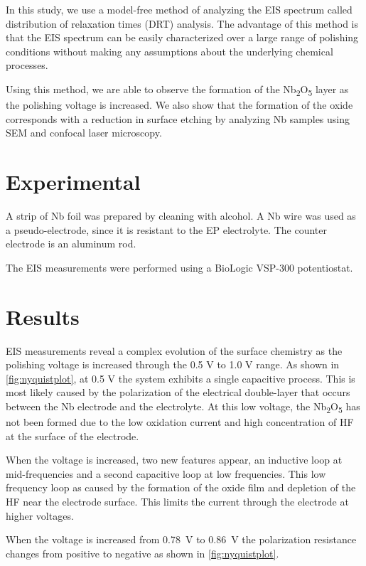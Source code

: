 \documentclass[11pt]{article}
\begin{document}
In this study, we use a model-free method of analyzing the EIS spectrum called distribution of relaxation times (DRT) analysis. The advantage of this method is that the EIS spectrum can be easily characterized over a large range of polishing conditions without making any assumptions about the underlying chemical processes. 

Using this method, we are able to observe the formation of the Nb\textsubscript{2}O\textsubscript{5} layer as the polishing voltage is increased. We also show that the formation of the oxide corresponds with a reduction in surface etching by analyzing Nb samples using SEM and confocal laser microscopy.


\section{Experimental}
\label{sec:orgb71f960}

A strip of Nb foil was prepared by cleaning with alcohol. A Nb wire was used as a pseudo-electrode, since it is resistant to the EP electrolyte. The counter electrode is an aluminum rod.

The EIS measurements were performed using a BioLogic VSP-300 potentiostat.



\section{Results}
\label{sec:org4a45003}

EIS measurements reveal a complex evolution of the surface chemistry as the polishing voltage is increased through the 0.5 V to 1.0 V range. As shown in \ref{fig:nyquistplot}, at 0.5 V the system exhibits a single capacitive process. This is most likely caused by the polarization of the electrical double-layer that occurs between the Nb electrode and the electrolyte. At this low voltage, the Nb\textsubscript{2}O\textsubscript{5} has not been formed due to the low oxidation current and high concentration of HF at the surface of the electrode.

When the voltage is increased, two new features appear, an inductive loop at mid-frequencies and a second capacitive loop at low frequencies. This low frequency loop as caused by the formation of the oxide film and depletion of the HF near the electrode surface. This limits the current through the electrode at higher voltages. 

When the voltage is increased from \qty{0.78}{\volt} to \qty{0.86}{\volt} the polarization resistance changes from positive to negative as shown in \ref{fig:nyquistplot}.
\end{document}
